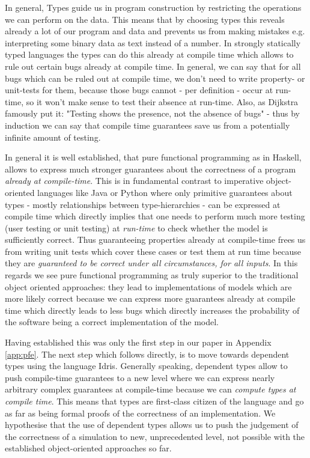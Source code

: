 In general, Types guide us in program construction by restricting the operations we can perform on the data. This means that by choosing types this reveals already a lot of our program and data and prevents us from making mistakes e.g. interpreting some binary data as text instead of a number. In strongly statically typed languages the types can do this already at compile time which allows to rule out certain bugs already at compile time. In general, we can say that for all bugs which can be ruled out at compile time, we don't need to write property- or unit-tests for them, because those bugs cannot - per definition - occur at run-time, so it won't make sense to test their absence at run-time. Also, as Dijkstra famously put it: "Testing shows the presence, not the absence of bugs" - thus by induction we can say that compile time guarantees save us from a potentially infinite amount of testing.

In general it is well established, that pure functional programming as in Haskell, allows to express much stronger guarantees about the correctness of a program \textit{already at compile-time}. This is in fundamental contrast to imperative object-oriented languages like Java or Python where only primitive guarantees about types - mostly relationships between type-hierarchies - can be expressed at compile time which directly implies that one needs to perform much more testing (user testing or unit testing) at \textit{run-time} to check whether the model is sufficiently correct. Thus guaranteeing properties already at compile-time frees us from writing unit tests which cover these cases or test them at run time because they are \textit{guaranteed to be correct under all circumstances, for all inputs}. In this regards we see pure functional programming as truly superior to the traditional object oriented approaches: they lead to implementations of models which are more likely correct because we can express more guarantees already at compile time which directly leads to less bugs which directly increases the probability of the software being a correct implementation of the model.

Having established this was only the first step in our paper in Appendix \ref{app:pfe}. The next step which follows directly, is to move towards dependent types using the language Idris. Generally speaking, dependent types allow to push compile-time guarantees to a new level where we can express nearly arbitrary complex guarantees at compile-time because we can \textit{compute types at compile time}. This means that types are first-class citizen of the language and go as far as being formal proofs of the correctness of an implementation. We hypothesise that the use of dependent types allows us to push the judgement of the correctness of a simulation to new, unprecedented level, not possible with the established object-oriented approaches so far.

